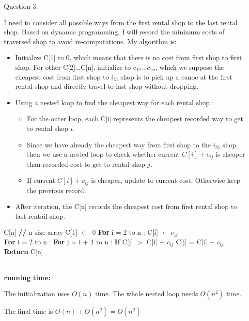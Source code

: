 \documentclass[12pt]{article}
\begin{document}
\pagebreak
\noindent
\large Question 3: \vspace{5mm} \par
\normalsize 
I need to consider all possible ways from the first rental shop to the last rental shop. 
Based on dynamic programming, I will record the minimum costs of traversed shop to avoid re-computations. 
My algorithm is:
\begin{itemize}
  \item	Initialize C[1] to 0, which means that there is no cost from first shop to first shop.  
	For other C[2]...C[n], initialize to $c_{1 2} ... c_{1 n}$, 
	which we suppose the cheapest cost from first shop to $i_{th}$ shop is to pick up a canoe at the first rental shop and directly travel to last shop without dropping.
  \item	Using a nested loop to find the cheapest way for each rental shop :
	\begin{itemize}
	  \item For the outer loop, each C[i] represents the cheapest recorded way to get to rental shop $i$.
	  \item Since we have already the cheapest way from first shop to the $i_{th}$ shop, 
		then we use a nested loop to check whether current $C[i] + c_{ij}$ is cheaper than recorded cost to get to rental shop $j$. 
	  \item If current $C[i] + c_{ij}$ is cheaper, update to current cost. Otherwise keep the previous record. 
	\end{itemize}
  \item After iteration, the C[n] records the cheapest cost from first rental shop to last rentail shop. 
\end{itemize}

\begin{algorithm}
\begin{algorithmic}
\State C[n] \textbf{ //} n-size array
\State C[1] $\leftarrow$ $0$
\State \textbf{For} i = 2 to n :
\State \hspace{0.4cm} C[i] $\leftarrow c_{1 i}$ \\

\State \textbf{For} i = 2 to n :
\State \hspace{0.4cm} \textbf{For} j = i + 1 to n :
\State \hspace{0.8cm} \textbf{If} C[j] $>$ C[i] + $c_{ij}$
\State \hspace{1.2cm} C[j] = C[i] + $c_{ij}$ \\
\State \textbf{Return} C[n]
\end{algorithmic}
\end{algorithm}
\noindent \\
\textbf{running time:} \par
The initialization uses $O(n)$ time. 
The whole nested loop needs $O(n^2)$ time. \par
The final time is $O(n) + O(n^2) = O(n^2)$
\end{document}
